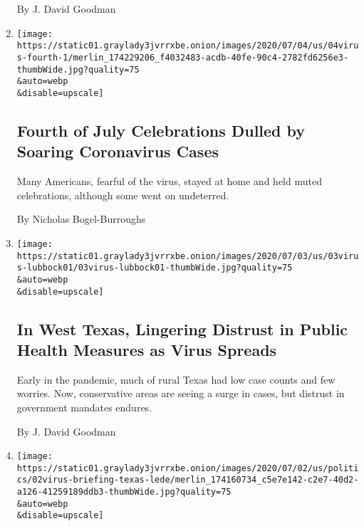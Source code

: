 \begin{enumerate}
  By J. David Goodman
\item
  \href{/2020/07/04/us/july-fourth-celebrations-coronavirus.html}{}

  \texttt{[image: https://static01.graylady3jvrrxbe.onion/images/2020/07/04/us/04virus-fourth-1/merlin\_174229206\_f4032483-acdb-40fe-90c4-2782fd6256e3-thumbWide.jpg?quality=75\\\&auto=webp\\\&disable=upscale]}

  \hypertarget{fourth-of-july-celebrations-dulled-by-soaring-coronavirus-cases}{%
  \subsection{Fourth of July Celebrations Dulled by Soaring Coronavirus
  Cases}\label{fourth-of-july-celebrations-dulled-by-soaring-coronavirus-cases}}

  Many Americans, fearful of the virus, stayed at home and held muted
  celebrations, although some went on undeterred.

  By Nicholas Bogel-Burroughs
\item
  \href{/2020/07/04/us/coronavirus-texas-lubbock.html}{}

  \texttt{[image: https://static01.graylady3jvrrxbe.onion/images/2020/07/03/us/03virus-lubbock01/03virus-lubbock01-thumbWide.jpg?quality=75\\\&auto=webp\\\&disable=upscale]}

  \hypertarget{in-west-texas-lingering-distrust-in-public-health-measures-as-virus-spreads}{%
  \subsection{In West Texas, Lingering Distrust in Public Health
  Measures as Virus
  Spreads}\label{in-west-texas-lingering-distrust-in-public-health-measures-as-virus-spreads}}

  Early in the pandemic, much of rural Texas had low case counts and few
  worries. Now, conservative areas are seeing a surge in cases, but
  distrust in government mandates endures.

  By J. David Goodman
\item
  \href{/2020/07/02/us/coronavirus-texas-masks.html}{}

  \texttt{[image: https://static01.graylady3jvrrxbe.onion/images/2020/07/02/us/politics/02virus-briefing-texas-lede/merlin\_174160734\_c5e7e142-c2e7-40d2-a126-41259189ddb3-thumbWide.jpg?quality=75\\\&auto=webp\\\&disable=upscale]}

  \hypertarget{texas-governor-reverses-course-and-orders-face-masks}{%
}
\end{enumerate}
